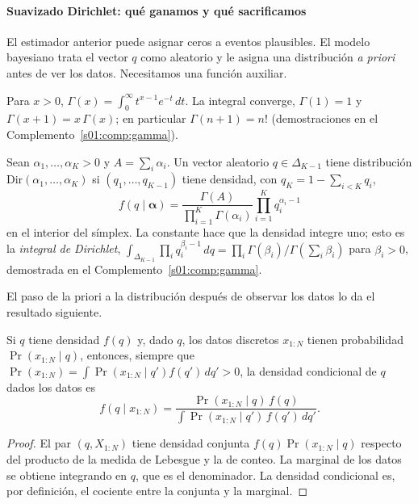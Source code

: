 \paragraph{Suavizado Dirichlet: qué ganamos y qué sacrificamos}\label{s01:dirichlet}
El estimador anterior puede asignar ceros a eventos plausibles. El modelo
bayesiano trata el vector $q$ como aleatorio y le asigna una distribución
\emph{a priori} antes de ver los datos. Necesitamos una función auxiliar.
\begin{definicion}\label{s01:def:gamma}
Para $x>0$, $\Gamma(x)=\int_0^\infty t^{x-1}e^{-t}\,dt$. La integral converge,
$\Gamma(1)=1$ y $\Gamma(x+1)=x\,\Gamma(x)$; en particular $\Gamma(n+1)=n!$
(demostraciones en el Complemento~\ref{s01:comp:gamma}).
\end{definicion}
\begin{definicion}\label{s01:def:dirichlet}
Sean $\alpha_1,\ldots,\alpha_K>0$ y $A=\sum_i\alpha_i$. Un vector aleatorio
$q\in\Delta_{K-1}$ tiene distribución $\mathrm{Dir}(\alpha_1,\ldots,\alpha_K)$ si
$(q_1,\ldots,q_{K-1})$ tiene densidad, con $q_K=1-\sum_{i<K}q_i$,
\[
f(q\mid\boldsymbol\alpha)=\frac{\Gamma(A)}{\prod_{i=1}^K\Gamma(\alpha_i)}
\prod_{i=1}^Kq_i^{\alpha_i-1}
\]
en el interior del símplex. La constante hace que la densidad integre uno; esto es
la \emph{integral de Dirichlet},
$\int_{\Delta_{K-1}}\prod_iq_i^{\beta_i-1}\,dq=\prod_i\Gamma(\beta_i)/\Gamma(\sum_i\beta_i)$
para $\beta_i>0$, demostrada en el Complemento~\ref{s01:comp:gamma}.
\end{definicion}
El paso de la priori a la distribución después de observar los datos lo da el
resultado siguiente.
\begin{teorema}\label{s01:teo:bayes}
Si $q$ tiene densidad $f(q)$ y, dado $q$, los datos discretos $x_{1:N}$ tienen
probabilidad $\Pr(x_{1:N}\mid q)$, entonces, siempre que
$\Pr(x_{1:N})=\int\Pr(x_{1:N}\mid q')f(q')\,dq'>0$, la densidad condicional de $q$
dados los datos es
\[
f(q\mid x_{1:N})=\frac{\Pr(x_{1:N}\mid q)\,f(q)}{\int\Pr(x_{1:N}\mid q')\,f(q')\,dq'}.
\]
\end{teorema}
\begin{proof}
El par $(q,X_{1:N})$ tiene densidad conjunta $f(q)\Pr(x_{1:N}\mid q)$ respecto del
producto de la medida de Lebesgue y la de conteo. La marginal de los datos se
obtiene integrando en $q$, que es el denominador. La densidad condicional es, por
definición, el cociente entre la conjunta y la marginal.
\end{proof}
